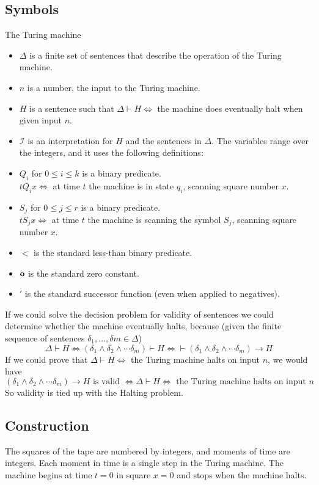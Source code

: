 \subsection{Symbols}
The Turing machine 

\begin{itemize}
\item $\Delta$ is a finite set of sentences that describe the operation of the Turing machine.
\item $n$ is a number, the input to the Turing machine.
\item $H$ is a sentence such that $\Delta\vdash H\iff$ the machine does eventually halt when given input $n$.
\item $\mathscr{I}$ is an interpretation for $H$ and the sentences in $\Delta$. The variables range over the integers, and it uses the following definitions:
\item $Q_i$ for $0 \le i \le k$ is a binary predicate.\\
$t Q_i x \iff $ at time $t$ the machine is in state $q_i$, scanning square number $x$.
\item $S_j$ for $0\le j\le r$ is a binary predicate.\\
$t S_j x \iff $ at time $t$ the machine is scanning the symbol $S_j$, scanning square number $x$.
\item $<$ is the standard less-than binary predicate.
\item $\mathbf{o}$ is the standard zero constant.
\item $'$ is the standard successor function (even when applied to negatives).
\end{itemize}

If we could solve the decision problem for validity of sentences we could determine whether the machine eventually halts, because (given the finite sequence of sentences $\delta_1,\dots,\delta m\in \Delta$)
\[\Delta\vdash H\iff (\delta_1\land \delta_2\land \cdots \delta_m)\vdash H \iff \vdash (\delta_1 \land  \delta_2 \land  \cdots\delta_m) \rightarrow H\]
If we could prove that $\Delta\vdash H \iff $ the Turing machine halts on input $n$, we would have
\[(\delta_1 \land  \delta_2 \land  \cdots\delta_m) \rightarrow H\text{ is valid }\iff \Delta\vdash H \iff \text{ the Turing machine halts on input }n\]
So validity is tied up with the Halting problem.

\subsection{Construction}
The squares of the tape are numbered by integers, and moments of time are integers. Each moment in time is a single step in the Turing machine. The machine begins at time $t=0$ in square $x=0$ and stops when the machine halts. 


